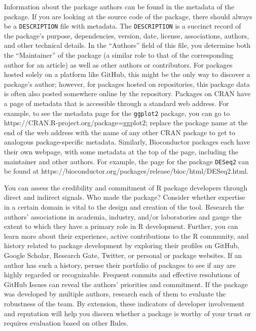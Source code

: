 \documentclass[10pt,letterpaper]{article}
\begin{document}
Information about the package authors can be found in the metadata of
the package. If you are looking at the source code of the package, there
should always be a \texttt{DESCRIPTION} file with metadata. The
\texttt{DESCRIPTION} is a succinct record of the package's purpose,
dependencies, version, date, license, associations, authors, and other
technical details. In the ``Authors'' field of this file, you determine
both the ``Maintainer'' of the package (a similar role to that of the
corresponding author for an article) as well as other authors or
contributors. For packages hosted solely on a platform like GitHub, this
might be the only way to discover a package's author; however, for
packages hosted on repositories, this package data is often also posted
somewhere online by the repository. Packages on CRAN have a page of
metadata that is accessible through a standard web address. For example,
to see the metadata page for the \texttt{ggplot2} package, you can go to
https://CRAN.R-project.org/package=ggplot2; replace the package name at
the end of the web address with the name of any other CRAN package to
get to analogous package-specific metadata. Similarly, Bioconductor
packages each have their own webpage, with some metadata at the top of
the page, including the maintainer and other authors. For example, the
page for the package \texttt{DESeq2} can be found at
https://bioconductor.org/packages/release/bioc/html/DESeq2.html.

You can assess the credibility and commitment of R package developers
through direct and indirect signals. Who made the package? Consider
whether expertise in a certain domain is vital to the design and
creation of the tool. Research the authors' associations in academia,
industry, and/or laboratories and gauge the extent to which they have a
primary role in R development. Further, you can learn more about their
experience, active contributions to the R community, and history related
to package development by exploring their profiles on GitHub, Google
Scholar, Research Gate, Twitter, or personal or package websites. If an
author has such a history, peruse their portfolio of packages to see if
any are highly regarded or recognizable. Frequent commits and effective
resolutions of GitHub Issues can reveal the authors' priorities and
commitment. If the package was developed by multiple authors, research
each of them to evaluate the robustness of the team. By extension, these
indicators of developer involvement and reputation will help you discern
whether a package is worthy of your trust or requires evaluation based
on other Rules.
\end{document}
